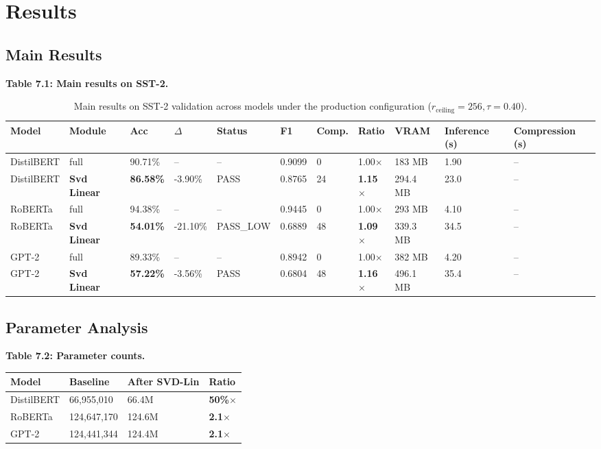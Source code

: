 
\section{Results}

\subsection{Main Results}

\textbf{Table 7.1: Main results on SST-2.}

\begin{table}[t]
\centering
\small
\begin{tabular}{lllllllllll}
\toprule
\textbf{Model} & \textbf{Module} & \textbf{Acc} & \textbf{$\Delta$} & \textbf{Status} & \textbf{F1} & \textbf{Comp.} & \textbf{Ratio} & \textbf{VRAM} & \textbf{Inference (s)} & \textbf{Compression (s)} \\
\midrule
DistilBERT & full & 90.71\% & -- & -- & 0.9099 & 0 & 1.00$\times$ & 183 MB & 1.90 & -- \\
DistilBERT & \textbf{Svd Linear} & \textbf{86.58\%} & -3.90\% & PASS & 0.8765 & 24 & \textbf{1.15$\times$} & 294.4 MB & 23.0 & -- \\
RoBERTa & full & 94.38\% & -- & -- & 0.9445 & 0 & 1.00$\times$ & 293 MB & 4.10 & -- \\
RoBERTa & \textbf{Svd Linear} & \textbf{54.01\%} & -21.10\% & PASS_LOW & 0.6889 & 48 & \textbf{1.09$\times$} & 339.3 MB & 34.5 & -- \\
GPT-2 & full & 89.33\% & -- & -- & 0.8942 & 0 & 1.00$\times$ & 382 MB & 4.20 & -- \\
GPT-2 & \textbf{Svd Linear} & \textbf{57.22\%} & -3.56\% & PASS & 0.6804 & 48 & \textbf{1.16$\times$} & 496.1 MB & 35.4 & -- \\
\bottomrule
\end{tabular}
\caption{Main results on SST-2 validation across models under the production configuration ($r_{\mathrm{ceiling}}=256, \tau=0.40$).}
\label{tab:main_sst2}
\end{table}

\subsection{Parameter Analysis}

\textbf{Table 7.2: Parameter counts.}

\begin{table}[H]
\centering
\small
\begin{tabular}{llll}
\toprule
\textbf{Model} & \textbf{Baseline} & \textbf{After SVD-Lin} & \textbf{Ratio} \\
\midrule
DistilBERT & 66,955,010 & 66.4M & \textbf{50\%$\times$} \\
RoBERTa & 124,647,170 & 124.6M & \textbf{2.1$\times$} \\
GPT-2 & 124,441,344 & 124.4M & \textbf{2.1$\times$} \\
\bottomrule
\end{tabular}
\end{table}

